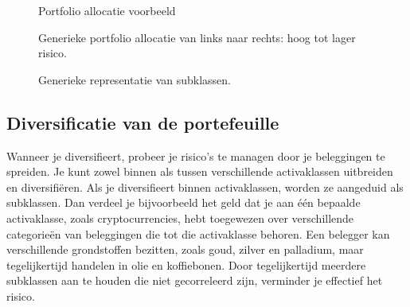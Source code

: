 \begin{figure}
    \centering
   
    
    \caption{Portfolio allocatie voorbeeld}
    \label{fig:portfolio example}
\end{figure}

\begin{figure}
    \centering
   
    
    \caption{Generieke portfolio allocatie van links naar rechts: hoog tot lager risico.}
    \label{fig:portfolio allocation}
\end{figure}

\begin{figure}
    \centering
{}
    \caption{Generieke representatie van subklassen.}
    \label{fig:subclasses}
\end{figure}


\subsection{Diversificatie van de portefeuille}
Wanneer je diversifieert, probeer je risico's te managen door je beleggingen te spreiden. Je kunt zowel binnen als tussen verschillende activaklassen uitbreiden en diversifi\"eren. Als je diversifieert binnen activaklassen, worden ze aangeduid als subklassen. Dan verdeel je bijvoorbeeld het geld dat je aan \'e\'en bepaalde activaklasse, zoals cryptocurrencies, hebt toegewezen over verschillende categorie\"en van beleggingen die tot die activaklasse behoren. Een belegger kan verschillende grondstoffen bezitten, zoals goud, zilver en palladium, maar tegelijkertijd handelen in olie en koffiebonen. Door tegelijkertijd meerdere subklassen aan te houden die niet gecorreleerd zijn, verminder je effectief het risico. 

